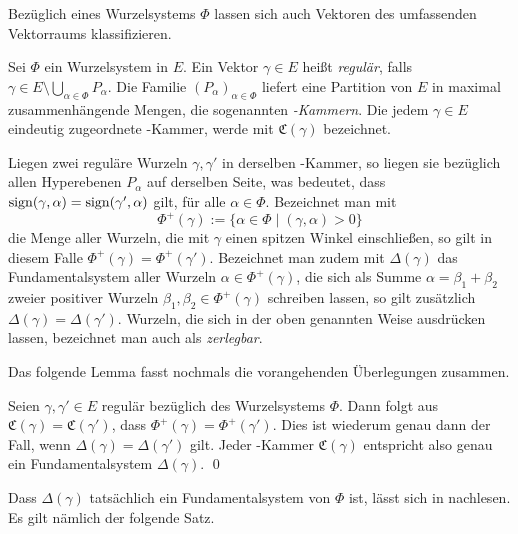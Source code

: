 Bezüglich eines Wurzelsystems $\Phi$ lassen sich auch Vektoren des umfassenden Vektorraums klassifizieren.

\begin{defn}
  Sei $\Phi$ ein Wurzelsystem in $E$.
  Ein Vektor $\gamma \in E$ heißt \emph{regulär}, falls $\gamma \in E \setminus \bigcup_{\alpha \in \Phi} P_\alpha$.
  Die Familie $(P_\alpha)_{\alpha \in \Phi}$ liefert eine Partition von $E$ in maximal zusammenhängende Mengen, die sogenannten \emph{\weyl\hyp{}Kammern}.
  Die jedem $\gamma \in E$ eindeutig zugeordnete \weyl\hyp{}Kammer, werde mit $\mathfrak{C}(\gamma)$ bezeichnet.
\end{defn}

Liegen zwei reguläre Wurzeln $\gamma, \gamma'$ in derselben \weyl\hyp{}Kammer, so liegen sie bezüglich allen Hyperebenen $P_\alpha$ auf derselben Seite, was bedeutet, dass $\operatorname{sign} (\gamma, \alpha) = \operatorname{sign}( \gamma', \alpha)$ gilt, für alle $\alpha \in \Phi$.
Bezeichnet man mit
\begin{displaymath}
  \Phi^+(\gamma) := \{ \alpha \in \Phi \mid (\gamma, \alpha) > 0 \}
\end{displaymath}
die Menge aller Wurzeln, die mit $\gamma$ einen spitzen Winkel einschließen, so gilt in diesem Falle $\Phi^+(\gamma) = \Phi^+(\gamma')$.
Bezeichnet man zudem mit $\Delta(\gamma)$ das Fundamentalsystem aller Wurzeln $\alpha \in \Phi^+(\gamma)$, die sich als Summe $\alpha = \beta_1 + \beta_2$ zweier positiver Wurzeln $\beta_1, \beta_2 \in \Phi^+(\gamma)$ schreiben lassen, so gilt zusätzlich $\Delta(\gamma) = \Delta(\gamma')$. 
Wurzeln, die sich in der oben genannten Weise ausdrücken lassen, bezeichnet man auch als \emph{zerlegbar}.

Das folgende Lemma fasst nochmals die vorangehenden Überlegungen zusammen.

\begin{lem}
  Seien $\gamma, \gamma' \in E$ regulär bezüglich des Wurzelsystems $\Phi$.
  Dann folgt aus $\mathfrak{C}(\gamma) = \mathfrak{C}(\gamma')$, dass $\Phi^+(\gamma) = \Phi^+(\gamma')$. 
  Dies ist wiederum genau dann der Fall, wenn $\Delta(\gamma) = \Delta(\gamma')$ gilt.
  Jeder \weyl\hyp{}Kammer $\mathfrak{C}(\gamma)$ entspricht also genau ein Fundamentalsystem $\Delta(\gamma)$. \qed
\end{lem}

Dass $\Delta(\gamma)$ tatsächlich ein Fundamentalsystem von $\Phi$ ist, lässt sich in \cite[S.48]{humphreys1972introduction} nachlesen.
Es gilt nämlich der folgende Satz.

